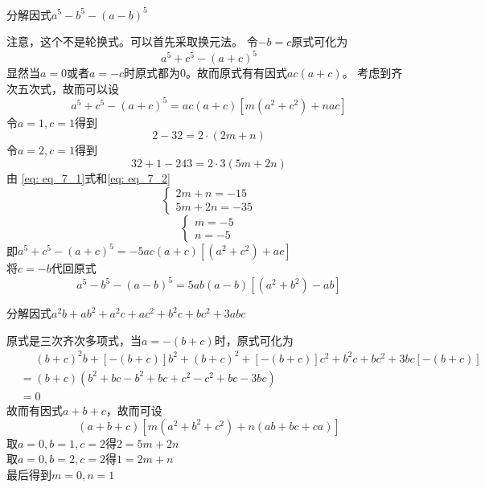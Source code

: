 \documentclass[windows,csize4]{BHCexam}
\begin{document}
\begin{groups}
\begin{questions}[]
        \question[5] 分解因式$a^5-b^5-(a-b)^5$
        \begin{solution}{0.5cm}
            注意，这个不是轮换式。可以首先采取换元法。
            \methodonly 令$-b=c$原式可化为
            \[
                a^5+c^5-(a+c)^5
            \]
            显然当$a=0$或者$a=-c$时原式都为$0$。故而原式有有因式$ac(a+c)$。
            考虑到齐次五次式，故而可以设
            \[
                a^5+c^5-(a+c)^5=ac(a+c)[m(a^2+c^2)+nac]
            \]
            令$a=1,c=1$得到
            \begin{equation}
                \label{eq: eq_7_1}
                2-32=2\cdot (2m+n)
            \end{equation}
            令$a=2,c=1$得到
            \begin{equation}
                \label{eq: eq_7_2}
                32+1-243=2\cdot 3(5m+2n)
            \end{equation}  
            由 \ref{eq: eq_7_1}式和\ref{eq: eq_7_2}         
            \begin{equation}
                \begin{cases}
                    2m+n=-15 \\
                    5m+2n=-35
                \end{cases}
            \end{equation}
            \begin{equation}
                \begin{cases}
                    m=-5 \\
                    n=-5
                \end{cases}
            \end{equation}
            即$a^5+c^5-(a+c)^5=-5ac(a+c)[(a^2+c^2)+ac]$ \\
            将$c=-b$代回原式
            \[
                a^5-b^5-(a-b)^5=5ab(a-b)[(a^2+b^2)-ab]
            \]
        \end{solution}
        \vspace{3.5cm}

        \question[5] 分解因式$a^2b+ab^2+a^2c+ac^2+b^2c+bc^2+3abc$
        \begin{solution}{0.5cm}
            \method 原式是三次齐次多项式，当$a=-(b+c)$时，原式可化为
            \[
                \begin{aligned}
                    & \phantom{=} (b+c)^2b+[-(b+c)]b^2+(b+c)^2+[-(b+c)]c^2+b^2c+bc^2+3bc[-(b+c)] \\
                    &= (b+c)(b^2+bc-b^2+bc+c^2-c^2+bc-3bc) \\
                    &=0
                \end{aligned}
            \]
            故而有因式$a+b+c$，故而可设
            \[
                (a+b+c)[m(a^2+b^2+c^2)+n(ab+bc+ca)]  
            \]
            取$a=0,b=1,c=2$得$2=5m+2n$ \\ 
            取$a=0,b=2,c=2$得$1=2m+n$ \\
            最后得到$m=0,n=1$


\end{solution}
\end{questions}
\end{groups}
\end{document}
